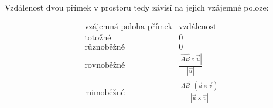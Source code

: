 Vzdálenost dvou přímek v prostoru tedy závisí na jejich vzájemné
poloze:

\[
    \begin{array}{c|c}
        \text{vzájemná poloha přímek} & \text{vzdálenost}\\
        \hline
        \text{totožné} & 0\\
        \text{různoběžné} & 0\\
        \text{rovnoběžné}
        &
        \displaystyle
        \frac{
            |\overrightarrow{AB}\times\vec{u}|
        }{
            |\vec{u}|
        }\\[4mm]
        \text{mimoběžné}
        &
        \displaystyle
        \frac{
            \left|
                \overrightarrow{AB}\cdot
                (\vec{u}\times\vec{v})
            \right|
        }{
            |\vec{u}\times\vec{v}|
        }
    \end{array}
\]